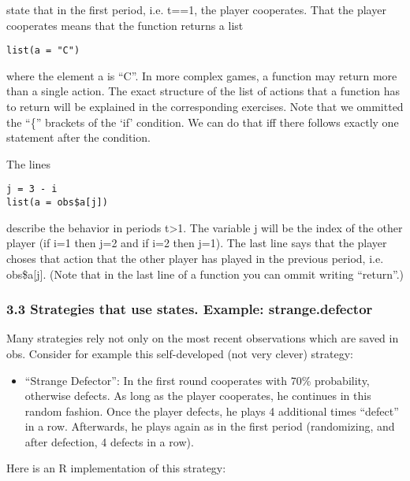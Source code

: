 \documentclass[]{article}
\begin{document}
state that in the first period, i.e. t==1, the player cooperates. That
the player cooperates means that the function returns a list

\begin{verbatim}
list(a = "C")
\end{verbatim}

where the element a is ``C''. In more complex games, a function may
return more than a single action. The exact structure of the list of
actions that a function has to return will be explained in the
corresponding exercises. Note that we ommitted the ``\{'' brackets of
the `if' condition. We can do that iff there follows exactly one
statement after the condition.

The lines

\begin{verbatim}
j = 3 - i
list(a = obs$a[j])
\end{verbatim}

describe the behavior in periods t\textgreater{}1. The variable j will
be the index of the other player (if i=1 then j=2 and if i=2 then j=1).
The last line says that the player choses that action that the other
player has played in the previous period, i.e. obs\$a{[}j{]}. (Note that
in the last line of a function you can ommit writing ``return''.)

\subsubsection{3.3 Strategies that use states. Example:
strange.defector}

Many strategies rely not only on the most recent observations which are
saved in obs. Consider for example this self-developed (not very clever)
strategy:

\begin{itemize}
\itemsep1pt\parskip0pt
\item
  ``Strange Defector'': In the first round cooperates with 70\%
  probability, otherwise defects. As long as the player cooperates, he
  continues in this random fashion. Once the player defects, he plays 4
  additional times ``defect'' in a row. Afterwards, he plays again as in
  the first period (randomizing, and after defection, 4 defects in a
  row).
\end{itemize}

Here is an R implementation of this strategy:
\end{document}
